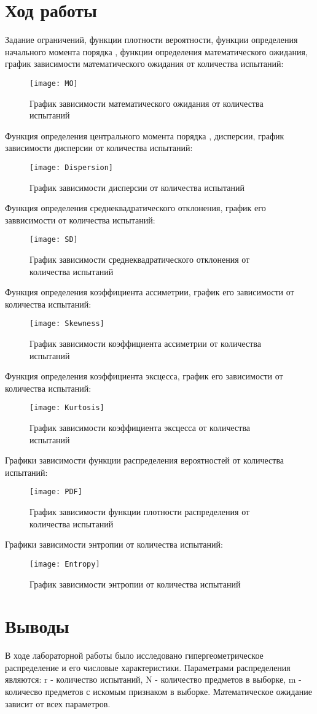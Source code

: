 \documentclass[a4paper,14pt]{extarticle}
\begin{document}
\section{Ход работы}
Задание ограничений, функции плотности вероятности, функции определения
начального момента порядка , функции определения математического
ожидания, график зависимости математического ожидания от количества испытаний:
\begin{figure}[H]
    \centering
    \texttt{[image: MO]}
    \caption{График зависимости математического ожидания от количества испытаний}
\end{figure}
Функция определения центрального момента порядка , дисперсии,
график зависимости дисперсии от количества испытаний:
\begin{figure}[H]
    \centering
    \texttt{[image: Dispersion]}
    \caption{График зависимости дисперсии от количества испытаний}
\end{figure}
Функция определения среднеквадратического отклонения, график его заввисимости
от количества испытаний:
\begin{figure}[H]
    \centering
    \texttt{[image: SD]}
    \caption{График зависимости среднеквадратического отклонения
    от количества испытаний}
\end{figure}
Функция определения коэффициента ассиметрии, график его зависимости
от количества испытаний:
\begin{figure}[H]
    \centering
    \texttt{[image: Skewness]}
    \caption{График зависимости коэффициента ассиметрии
    от количества испытаний}
\end{figure}
Функция определения коэффициента эксцесса, график его зависимости
от количества испытаний:
\begin{figure}[H]
    \centering
    \texttt{[image: Kurtosis]}
    \caption{График зависимости коэффициента эксцесса
    от количества испытаний}
\end{figure}
Графики зависимости функции распределения вероятностей от
количества испытаний:
\begin{figure}[H]
    \centering
    \texttt{[image: PDF]}
    \caption{График зависимости функции плотности распределения
    от количества испытаний}
\end{figure}

Графики зависимости энтропии от количества испытаний:
\begin{figure}[H]
    \centering
    \texttt{[image: Entropy]}
    \caption{График зависимости энтропии
    от количества испытаний}
\end{figure}
\section*{Выводы}
В ходе лабораторной работы было исследовано гипергеометрическое
распределение и его числовые характеристики. Параметрами
распределения являются: r - количество испытаний, N - количество
предметов в выборке, m - количесво предметов с искомым признаком
в выборке. Математическое ожидание зависит от всех параметров.
\end{document}
